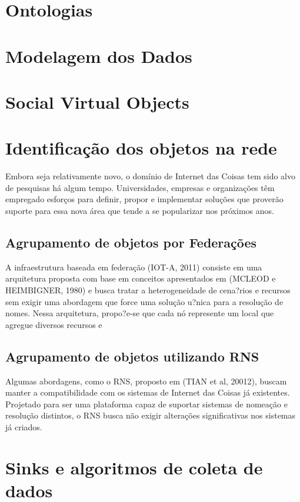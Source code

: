 \section{Ontologias}

\section{Modelagem dos Dados}

\section{Social Virtual Objects}

\section{Identifica\c{c}\~{a}o dos objetos na rede}
	Embora seja relativamente novo, o dom\'{i}nio de Internet das Coisas tem sido alvo de pesquisas h\'{a} algum tempo. Universidades, empresas e organiza\c{c}\~{o}es t\^{e}m empregado esfor\c{c}os para definir, propor e implementar solu\c{c}\~{o}es que prover\~{a}o suporte para essa nova \'{a}rea que tende a se popularizar nos pr\'{o}ximos anos.	
	
\subsection{Agrupamento de objetos por Federa\c{c}\~{o}es}
	 A infraestrutura baseada em federa\c{c}\~{a}o (IOT-A, 2011) consiste em uma arquitetura proposta com base em conceitos apresentados em (MCLEOD e HEIMBIGNER, 1980) e busca tratar a heterogeneidade de cena?rios e recursos sem exigir uma abordagem que force uma solu\c{c}\~{a}o u?nica para a resolu\c{c}\~{a}o de nomes. Nessa arquitetura, propo?e-se que cada n\'{o} represente um local que agregue diversos recursos e	

\subsection{Agrupamento de objetos utilizando RNS}
	Algumas abordagens, como o RNS, proposto em (TIAN et al, 20012), buscam manter a compatibilidade com os sistemas de Internet das Coisas j\'{a} existentes. Projetado para ser uma plataforma capaz de suportar sistemas de nomea\c{c}\~{a}o e resolu\c{c}\~{a}o distintos, o RNS busca n\~{a}o exigir altera\c{c}\~{o}es significativas nos sistemas j\'{a} criados.


\section{Sinks e algoritmos de coleta de dados}

